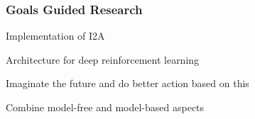 \begin{frame}
    \frametitle{Goals Guided Research}

\begin{PraesentationAufzaehlung}
    \item Implementation of I2A
    \item 
\end{PraesentationAufzaehlung}

\end{frame}
\clearpage


\begin{frame}

\begin{PraesentationAufzaehlung}
    \item Architecture for deep reinforcement learning
    \item Imaginate the future and do better action based on this
    \item Combine model-free and model-based aspects
\end{PraesentationAufzaehlung}

\end{frame}
\clearpage

